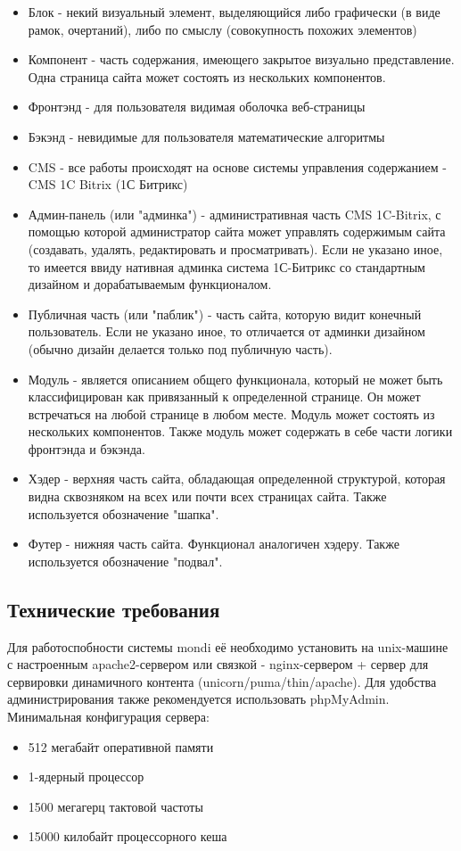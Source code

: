 \documentclass[DIV=calc, paper=a4, fontsize=11pt]{scrartcl} %
\begin{document}
        \begin{itemize}
        \item Блок - некий визуальный элемент, выделяющийся либо графически (в виде рамок, очертаний), либо по смыслу (совокупность похожих элементов)
        \item Компонент - часть содержания, имеющего закрытое визуально представление. Одна страница сайта может состоять из нескольких компонентов.
        \item Фронтэнд - для пользователя видимая оболочка веб-страницы
        \item Бэкэнд - невидимые для пользователя математические алгоритмы
        \item CMS - все работы происходят на основе системы управления содержанием - CMS 1C Bitrix (1С Битрикс)
        \item Админ-панель (или "админка") - административная часть CMS 1C-Bitrix, с помощью которой администратор сайта может управлять содержимым сайта (создавать, удалять, редактировать и просматривать). Если не указано иное, то имеется ввиду нативная админка система 1С-Битрикс со стандартным дизайном и дорабатываемым функционалом.
        \item Публичная часть (или "паблик") - часть сайта, которую видит конечный пользователь. Если не указано иное, то отличается от админки дизайном (обычно дизайн делается только под публичную часть).
        \item Модуль - является описанием общего функционала, который не может быть классифицирован как привязанный к определенной странице. Он может встречаться на любой странице в любом месте. Модуль может состоять из нескольких компонентов. Также модуль может содержать в себе части логики фронтэнда и бэкэнда.
        \item Хэдер - верхняя часть сайта, обладающая определенной структурой, которая видна сквозняком на всех или почти всех страницах сайта. Также используется обозначение "шапка".
        \item Футер - нижняя часть сайта. Функционал аналогичен хэдеру. Также используется обозначение "подвал".
    \end{itemize}
    
\subsection{Технические требования}
Для работоспобности системы mondi её необходимо установить на unix-машине с настроенным apache2-сервером или связкой - nginx-сервером + сервер для сервировки динамичного контента (unicorn/puma/thin/apache).
Для удобства администрирования также рекомендуется использовать phpMyAdmin.
\\[0.5cm]
Минимальная конфигурация сервера:
\begin{itemize}
	\item 512 мегабайт оперативной памяти
	\item 1-ядерный процессор
	\item 1500 мегагерц тактовой частоты
	\item 15000 килобайт процессорного кеша
\end{itemize}
\end{document}
